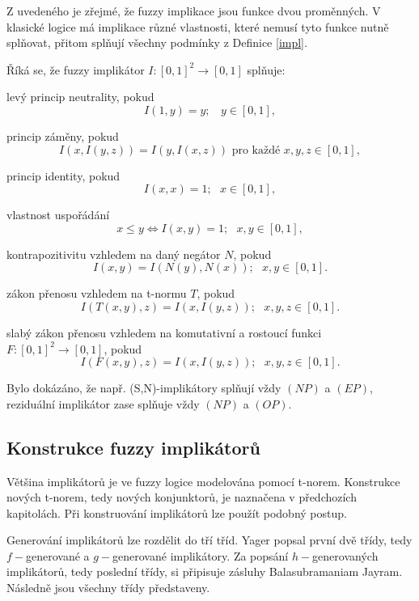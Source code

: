 Z uveden\'eho je z\v rejm\'e, \v ze fuzzy implikace jsou funkce dvou prom\v enn\'ych.
V klasick\'e logice m\'a implikace r\r uzn\'e vlastnosti, kter\'e nemus\'i tyto funkce nutn\v e spl\v novat, p\v ritom spl\v nuj\'i v\v sechny podm\'inky z Definice \ref{impl}.

\begin{definition}
\cite{Springer}
Říká se, že fuzzy implik\'ator $I:[0,1]^2 \rightarrow [0,1]$ spl\v nuje:
\begin{enumerate}
\item[(NP)] levý princip neutrality, pokud
$$I(1,y)=y; ~~~~y \in [0,1],$$
\item[(EP)] princip z\'aměny, pokud
$$I(x,I(y,z))=I(y,I(x,z)) \mbox{  pro ka\v zd\'e   } x,y,z \in [0,1],$$
\item[(IP)] princip identity, pokud
$$I(x,x) = 1; ~~~ x \in [0,1], $$
\item[(OP)] vlastnost uspořádání
$$x \leq y \iff I(x,y) =1; ~~~ x,y \in [0,1],$$
\item[(CP)] kontrapozitivitu vzhledem na dan\'y neg\'ator $N$, pokud
$$ I(x,y)=I(N(y),N(x)); ~~~ x,y \in [0,1].$$
 {\item[(LI)] z\'akon přenosu  vzhledem na  t-normu $T$, pokud
$$I(T(x, y), z) = I(x, I(y, z)); ~~~ x,y,z \in  [0, 1].$$
\item[(WLI)]  slab\'y z\'akon přenosu vzhledem na komutativní a
rostoucí funkci $F:
[0,1]^2 \to [0, 1]$, pokud
$$I(F(x, y), z) = I(x, I(y, z)); ~~~  x,y,z \in  [0, 1].$$}
\end{enumerate}
\end{definition}

\begin{remark}
    Bylo dok\'az\'ano, \v ze nap\v r. (S,N)-implikátory spl\v nují v\v zdy $(NP)$ a $(EP)$, reziduální implikátor zase spl\v nuje v\v zdy $(NP)$ a $(OP).$
\end{remark}

\subsection{Konstrukce fuzzy implikátor\r u}

Většina implikátor\r u je ve fuzzy logice modelována pomocí t-norem. Konstrukce nových t-norem, tedy nových konjunktor\r u, je naznačena v předchozích kapitolách. Při konstruování implikátor\r u lze použít podobný postup.

Generování implikátor\r u lze rozdělit do tří tříd. Yager popsal první dvě třídy, tedy $f-$generované a $g-$generované implikátory. Za popsání  $h-$generovaných implikátor\r u, tedy poslední třídy, si připisuje zásluhy Balasubramaniam Jayram. Následně jsou všechny třídy představeny.

